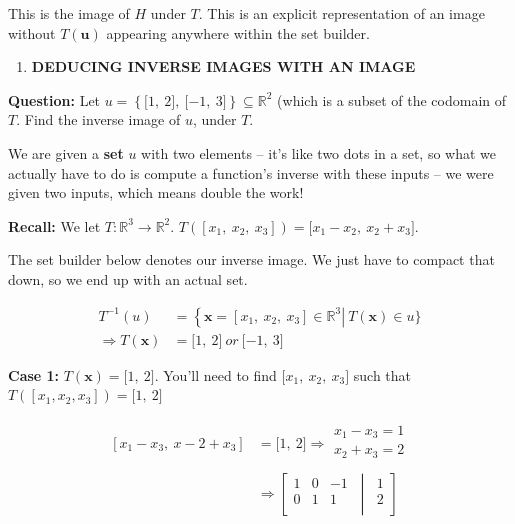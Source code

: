 \documentclass[12pt]{article}
\theoremstyle{plain}
\theoremstyle{remark}
\theoremstyle{definition}
\begin{document}
This is the image of \(H\) under \(T\). This is an explicit
representation of an image without \(T(\mathbf{u})\) appearing
anywhere within the set builder.

\begin{enumerate}
\def\labelenumi{\arabic{enumi}.}
\setcounter{enumi}{2}
\item
  \textbf{DEDUCING INVERSE IMAGES WITH AN IMAGE}
\end{enumerate}

\textbf{Question:} Let
\(u = \left\{ \lbrack 1,\ 2\rbrack,\ \lbrack - 1,\ 3\rbrack \right\} \subseteq \mathbb{R}^{2}\)
(which is a subset of the codomain of \(T\). Find the inverse image of
\(u\), under \(T\).

We are given a \textbf{set} \(u\) with two elements -- it's like two
dots in a set, so what we actually have to do is compute a function's
inverse with these inputs -- we were given two inputs, which means
double the work!

\textbf{Recall:} We let \(T:\mathbb{R}^{3} \rightarrow \mathbb{R}^{2}\).
\(T\left( \left\lbrack x_{1},\ x_{2},\ x_{3} \right\rbrack \right) = \lbrack x_{1} - x_{2},\ x_{2} + x_{3}\rbrack\).

The set builder below denotes our inverse image. We just have to compact
that down, so we end up with an actual set.

\begin{align*}
T^{- 1}(u) &= \left\{ \mathbf{x} = \left\lbrack x_{1},\ x_{2},\ x_{3} \right\rbrack \in \mathbb{R}^{3} \right|\ T\left( \mathbf{x} \right) \in u\} \\
\Rightarrow T\left( \mathbf{x} \right) &= \lbrack 1,\ 2\rbrack\ or\ \lbrack - 1,\ 3\rbrack
\end{align*}


\textbf{Case 1:}
\(T\left( \mathbf{x} \right) = \lbrack 1,\ 2\rbrack\). You'll need
to find \(\lbrack x_{1},\ x_{2},\ x_{3}\rbrack\) such that
\(T\left( \left\lbrack x_{1},x_{2},x_{3} \right\rbrack \right) = \lbrack 1,\ 2\rbrack\)

\begin{align*}
\left\lbrack x_{1} - x_{3},\ x - 2 + x_{3} \right\rbrack &= \lbrack 1,\ 2\rbrack \Rightarrow \begin{matrix}x_{1} - x_{3} = 1 \\x_{2} + x_{3} = 2 \\\end{matrix} \\
&\Rightarrow \left\lbrack \begin{matrix}1 & 0 & - 1 \\0 & 1 & 1 \\\end{matrix}\  \middle| \ \begin{matrix}1 \\2 \\\end{matrix} \right\rbrack
\end{align*}
\end{document}
